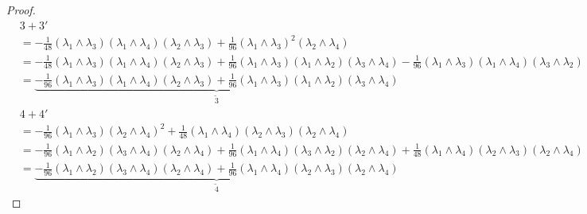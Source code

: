 \documentclass[11pt]{amsart}
\theoremstyle{definition}
\theoremstyle{remark}
\numberwithin{equation}{section}
\begin{document}
\begin{proof}
\begin{align*}
&\boxed{3}+\boxed{3'}\\
   &= -{\frac{1}{48}\left(\lambda_1 \wedge \lambda_3\right)\left(\lambda_1 \wedge \lambda_4\right)\left(\lambda_2 \wedge \lambda_3\right)}+{\frac{1}{96}\left(\lambda_1 \wedge \lambda_3\right)^2\left(\lambda_2 \wedge \lambda_4\right)} \\
   &=-\frac{1}{48}\left(\lambda_1 \wedge \lambda_3\right)\left(\lambda_1 \wedge \lambda_4\right)\left(\lambda_2 \wedge \lambda_3\right)+\frac{1}{96}\left(\lambda_1 \wedge \lambda_3\right)\left(\lambda_1 \wedge \lambda_2\right)\left(\lambda_3 \wedge \lambda_4\right)-\frac{1}{96}\left(\lambda_1 \wedge \lambda_3\right)\left(\lambda_1 \wedge \lambda_4\right)\left(\lambda_3 \wedge \lambda_2\right)\\
   &=\underbrace{-\frac{1}{96}\left(\lambda_1 \wedge \lambda_3\right)\left(\lambda_1 \wedge \lambda_4\right)\left(\lambda_2 \wedge \lambda_3\right)+\frac{1}{96}\left(\lambda_1 \wedge \lambda_3\right)\left(\lambda_1 \wedge \lambda_2\right)\left(\lambda_3 \wedge \lambda_4\right)}_{\boxed{\tilde{3}}}
\end{align*}
\begin{align*}
&\boxed{4}+\boxed{4'}\\
   &= -{\frac{1}{96}\left(\lambda_1 \wedge \lambda_3\right)\left(\lambda_2 \wedge \lambda_4\right)^2}+{\frac{1}{48}\left(\lambda_1 \wedge \lambda_4\right)\left(\lambda_2 \wedge \lambda_3\right)\left(\lambda_2 \wedge \lambda_4\right) } \\
   & =-\frac{1}{96}\left(\lambda_1 \wedge \lambda_2\right)\left(\lambda_3 \wedge \lambda_4\right)\left(\lambda_2 \wedge \lambda_4\right)+\frac{1}{96}\left(\lambda_1 \wedge \lambda_4\right)\left(\lambda_3 \wedge \lambda_2\right)\left(\lambda_2 \wedge \lambda_4\right)+\frac{1}{48}\left(\lambda_1 \wedge \lambda_4\right)\left(\lambda_2 \wedge \lambda_3\right)\left(\lambda_2 \wedge \lambda_4\right)\\
    &=\underbrace{-\frac{1}{96}\left(\lambda_1 \wedge \lambda_2\right)\left(\lambda_3 \wedge \lambda_4\right)\left(\lambda_2 \wedge \lambda_4\right)+\frac{1}{96}\left(\lambda_1 \wedge \lambda_4\right)\left(\lambda_2 \wedge \lambda_3\right)\left(\lambda_2 \wedge \lambda_4\right)}_{\boxed{\tilde{4}}}
\end{align*}


\end{proof}
\end{document}
